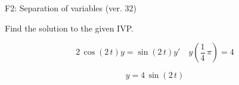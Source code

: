 \begin{exercise}
  \begin{exerciseTitle}F2: Separation of variables (ver. 32)\end{exerciseTitle}
  \begin{exerciseStatement}
    
Find the solution to the given IVP.

    
\[2 \, \cos\left(2 \, t\right) y= \sin\left(2 \, t\right) y'\hspace{1em} y\left( \frac{1}{4} \, \pi \right)= 4\]

  \end{exerciseStatement}
  \begin{exerciseAnswer}
    
\[y= 4 \, \sin\left(2 \, t\right)\]

  \end{exerciseAnswer}
\end{exercise}